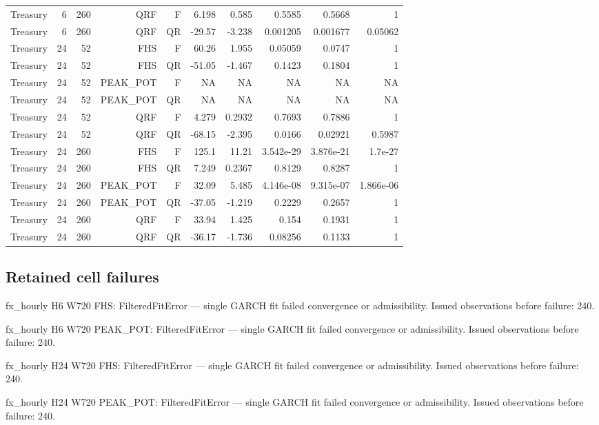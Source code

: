 \documentclass[10pt,a4paper]{article}
\begin{document}
\begin{center}
\begin{minipage}{\linewidth}
\begin{tabular}{lrrrrrrrrr}
Treasury & 6 & 260 & QRF & F & 6.198 & 0.585 & 0.5585 & 0.5668 & 1 \\
Treasury & 6 & 260 & QRF & QR & -29.57 & -3.238 & 0.001205 & 0.001677 & 0.05062 \\
Treasury & 24 & 52 & FHS & F & 60.26 & 1.955 & 0.05059 & 0.0747 & 1 \\
Treasury & 24 & 52 & FHS & QR & -51.05 & -1.467 & 0.1423 & 0.1804 & 1 \\
Treasury & 24 & 52 & PEAK\_POT & F & NA & NA & NA & NA & NA \\
Treasury & 24 & 52 & PEAK\_POT & QR & NA & NA & NA & NA & NA \\
Treasury & 24 & 52 & QRF & F & 4.279 & 0.2932 & 0.7693 & 0.7886 & 1 \\
Treasury & 24 & 52 & QRF & QR & -68.15 & -2.395 & 0.0166 & 0.02921 & 0.5987 \\
Treasury & 24 & 260 & FHS & F & 125.1 & 11.21 & 3.542e-29 & 3.876e-21 & 1.7e-27 \\
Treasury & 24 & 260 & FHS & QR & 7.249 & 0.2367 & 0.8129 & 0.8287 & 1 \\
Treasury & 24 & 260 & PEAK\_POT & F & 32.09 & 5.485 & 4.146e-08 & 9.315e-07 & 1.866e-06 \\
Treasury & 24 & 260 & PEAK\_POT & QR & -37.05 & -1.219 & 0.2229 & 0.2657 & 1 \\
Treasury & 24 & 260 & QRF & F & 33.94 & 1.425 & 0.154 & 0.1931 & 1 \\
Treasury & 24 & 260 & QRF & QR & -36.17 & -1.736 & 0.08256 & 0.1133 & 1 \\
\bottomrule
\end{tabular}
\end{minipage}
\end{center}
\subsection*{Retained cell failures}
fx\_hourly H6 W720 FHS: FilteredFitError --- single GARCH fit failed convergence or admissibility. Issued observations before failure: 240.

fx\_hourly H6 W720 PEAK\_POT: FilteredFitError --- single GARCH fit failed convergence or admissibility. Issued observations before failure: 240.

fx\_hourly H24 W720 FHS: FilteredFitError --- single GARCH fit failed convergence or admissibility. Issued observations before failure: 240.

fx\_hourly H24 W720 PEAK\_POT: FilteredFitError --- single GARCH fit failed convergence or admissibility. Issued observations before failure: 240.
\end{document}
